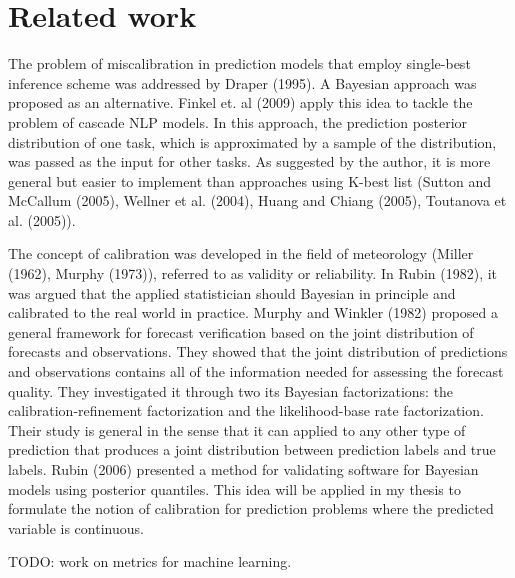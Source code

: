 \chapter{Related work}
\doublespacenormalsize
The problem of miscalibration in prediction models that employ single-best inference scheme was addressed by Draper (1995). A Bayesian approach was proposed as an alternative. Finkel et. al (2009) apply this idea to tackle the problem of cascade NLP models. In this approach, the prediction posterior distribution of one task, which is approximated by a sample of the distribution, was passed as the input for other tasks. As suggested by the author, it is more general but easier to implement than approaches using K-best list (Sutton and McCallum (2005), Wellner et al. (2004), Huang and Chiang (2005), Toutanova et al. (2005)).

The concept of calibration was developed in the field of meteorology (Miller (1962), Murphy (1973)), referred to as validity or reliability. In Rubin (1982), it was argued that the applied statistician should Bayesian in principle and calibrated to the real world in practice. Murphy and Winkler (1982) proposed a general framework for forecast verification based on the joint distribution of forecasts and observations. They showed that the joint distribution of predictions and observations contains all of the information needed for assessing the forecast quality. They investigated it through two its Bayesian factorizations: the calibration-refinement factorization and the likelihood-base rate factorization. Their study is general in the sense that it can applied to any other type of prediction that produces a joint distribution between prediction labels and true labels. Rubin (2006) presented a method for validating software for Bayesian models using posterior quantiles. This idea will be applied in my thesis to formulate the notion of calibration for prediction problems where the predicted variable is continuous. 

TODO: work on metrics for machine learning.

